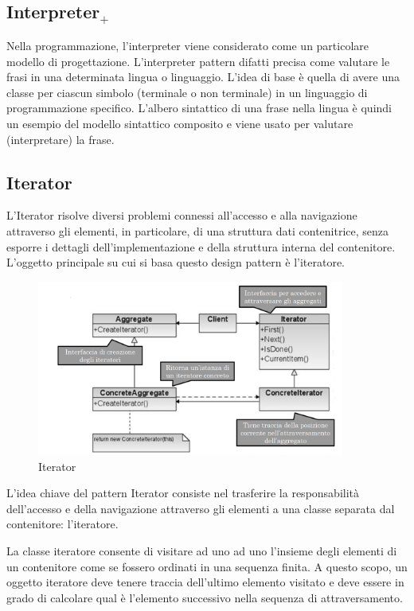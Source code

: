\subsection{Interpreter$_+$}
Nella programmazione, l'interpreter viene considerato come un particolare modello di progettazione. 
L'interpreter pattern difatti precisa come valutare le frasi in una determinata lingua o linguaggio. 
L'idea di base è quella di avere una classe per ciascun simbolo (terminale o non terminale) in un linguaggio di programmazione specifico.
L'albero sintattico di una frase nella lingua è quindi un esempio del modello sintattico composito e viene usato per valutare (interpretare) la frase.

\subsection{Iterator}
L'Iterator risolve diversi problemi connessi all'accesso e alla navigazione attraverso gli elementi, in particolare, di una struttura dati contenitrice, senza esporre i dettagli dell'implementazione e della struttura interna del contenitore. 
L'oggetto principale su cui si basa questo design pattern è l'iteratore.

\begin{figure}[H]
\includegraphics[width=0.9\textwidth]{res/img/DP/iterator}
\caption{Iterator}
\end{figure}

L'idea chiave del pattern Iterator consiste nel trasferire la responsabilità dell'accesso e della navigazione attraverso gli elementi a una classe separata dal contenitore: l'iteratore.

La classe iteratore consente di visitare ad uno ad uno l'insieme degli elementi di un contenitore come se fossero ordinati in una sequenza finita. 
A questo scopo, un oggetto iteratore deve tenere traccia dell'ultimo elemento visitato e deve essere in grado di calcolare qual è l'elemento successivo nella sequenza di attraversamento.

